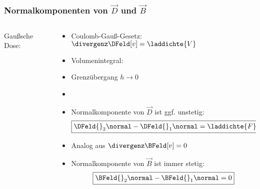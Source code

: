 \begin{frame}
  \frametitle{Normalkomponenten von $\vec{D}$ und $\vec{B}$}
\begin{columns}
  \begin{column}{0.4\textwidth}
    Gaußsche Dose:\\[2em]

    
	\resizebox{\columnwidth}{!}{}

    \end{column}
    \begin{column}{0.6\textwidth}
      \begin{itemize}
        \item<1-> Coulomb-Gauß-Gesetz: $\divergenz \DFeld[v] =
          \laddichte{V}$
          \item<2-> Volumenintegral: 
          \item<4-> Grenzübergang $h\to0$
            \item<5-> 
          \item<7-> \alert{Normalkomponente von $\vec{D}$ ist ggf. unstetig:} 
            $$	\boxed{\DFeld{}_2\normal -
              \DFeld{}_1\normal = \laddichte{F}} $$
          \item<8-> Analog aus $\divergenz \BFeld[v] = 0$
            \item<9-> \alert{Normalkomponente von $\vec{B}$ ist immer stetig:} 
            $$		\boxed{\BFeld{}_2\normal - \BFeld{}_1\normal = 0} $$
        \end{itemize}
    \end{column}
\end{columns}
 \end{frame}

